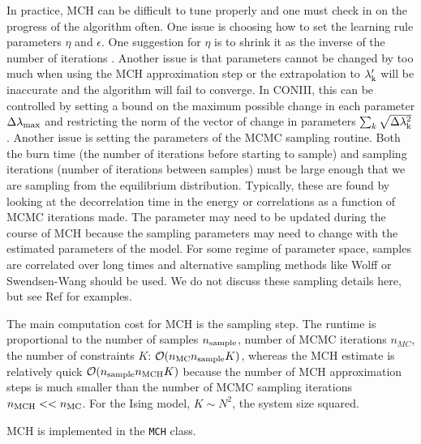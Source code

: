 \documentclass[aps,prl,twocolumn,nofootinbib]{revtex4-1}
\begin{document}
In practice, MCH can be difficult to tune properly and one must check in on the progress of the algorithm often. One issue is choosing how to set the learning rule parameters $\eta$ and $\epsilon$. One suggestion for $\eta$ is to shrink it as the inverse of the number of iterations \cite{Tkacik:2006vq}. Another issue is that parameters cannot be changed by too much when using the MCH approximation step or the extrapolation to $\lambda_{\rm k}'$ will be inaccurate and the algorithm will fail to converge. In CONIII, this can be controlled by setting a bound on the maximum possible change in each parameter  $\Delta\lambda_{\rm max}$ and restricting the norm of the vector of change in parameters $\sum_k \sqrt{\Delta\lambda_{\rm k}^2}$. Another issue is setting the parameters of the MCMC sampling routine. Both the burn time (the number of iterations before starting to sample) and sampling iterations (number of iterations between samples) must be large enough that we are sampling from the equilibrium distribution.  Typically, these are found by looking at the decorrelation time in the energy or correlations as a function of MCMC iterations made. The parameter may need to be updated during the course of MCH because the sampling parameters may need to change with the estimated parameters of the model. For some regime of parameter space, samples are correlated over long times and alternative sampling methods like Wolff or Swendsen-Wang should be used.
We do not discuss these sampling details here, but see Ref \cite{MacKay:2005wc,Newman:1999wu} for examples.

The main computation cost for MCH is the sampling step. The runtime is proportional to the number of samples $n_{\rm sample}$, number of MCMC iterations $n_{MC}$, the number of constraints $K$:
$\mathcal{O}(n_{\rm MC} n_{\rm sample} K)$, whereas the MCH estimate is relatively quick $\mathcal{O}(n_{\rm sample}n_{\rm MCH}K)$ because the number of MCH approximation steps is much smaller than the number of MCMC sampling iterations $n_{\rm MCH}<<n_{\rm MC}$. 
For the Ising model, $K\sim N^2$, the system size squared.

MCH is implemented in the {\tt MCH} class.
\end{document}
